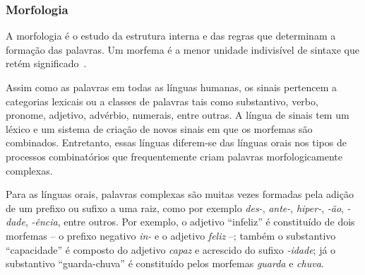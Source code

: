 


\subsubsection{Morfologia}
\label{linguistica-gramatica-morfologia}

A morfologia é o estudo da estrutura interna e das regras que determinam a formação das palavras. Um morfema é a menor unidade indivisível de sintaxe que retém significado~\cite{quadros-2004-estudos-linguisticos,jay-2011-dont-just-sign}.

Assim como as palavras em todas as línguas humanas, os sinais pertencem a categorias lexicais ou a classes de palavras tais como substantivo, verbo, pronome, adjetivo, advérbio, numerais, entre outras. A língua de sinais tem um léxico e um sistema de criação de novos sinais em que os morfemas são combinados. Entretanto, essas línguas diferem-se das línguas orais nos tipos de processos combinatórios que frequentemente criam palavras morfologicamente complexas. 

Para as línguas orais, palavras complexas são muitas vezes formadas pela adição de um prefixo ou sufixo a uma raiz, como por exemplo \textit{des-}, \textit{ante-}, \textit{hiper-}, \textit{-ão}, \textit{-dade}, \textit{-ência}, entre outros. Por exemplo, o adjetivo ``infeliz'' é constituído de dois morfemas -- o prefixo negativo \textit{in-} e o adjetivo \textit{feliz} --; também o substantivo ``capacidade'' é composto do adjetivo \textit{capaz} e acrescido do sufixo \textit{-idade}; já o substantivo ``guarda-chuva'' é constituído pelos morfemas \textit{guarda} e \textit{chuva}.

